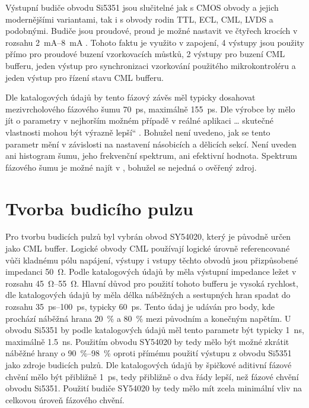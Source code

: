 Výstupní budiče obvodu Si5351 jsou slučitelné jak s \acrshort{CMOS} obvody a jejich modernějšími variantami, tak i s obvody rodin \acrshort{TTL}, \acrshort{ECL}, \acrshort{CML}, \acrshort{LVDS} a podobnými. Budiče jsou proudové, proud je možné nastavit ve čtyřech krocích v rozsahu \SIrange{2}{8}{\milli\ampere} \cite{Si5351datasheet}. Tohoto faktu je využito v zapojení, 4 výstupy jsou použity přímo pro proudové buzení vzorkovacích můstků, 2 výstupy pro buzení \acrshort{CML} bufferu, jeden výstup pro synchronizaci vzorkování použitého mikrokontroléru a jeden výstup pro řízení stavu \acrshort{CML} bufferu.

Dle katalogových údajů by tento fázový závěs měl typicky dosahovat mezivrcholového fázového šumu \SI{70}{\pico\second}, maximálně  \SI{155}{\pico\second}. Dle výrobce by mělo jít o parametry v \quotedblbase nejhorším možném případě v reálné aplikaci \ldots{} skutečné vlastnosti mohou být výrazně lepší\textquotedblleft{} \cite{Si5351datasheet}. Bohužel není uvedeno, jak se tento parametr mění v závislosti na nastavení násobicích a dělicích sekcí. Není uveden ani histogram šumu, jeho frekvenční spektrum, ani efektivní hodnota. Spektrum fázového šumu je možné najít v \cite{Si5351_phase_noise_measurement}, bohužel se nejedná o ověřený zdroj.

\section{Tvorba budicího pulzu}
Pro tvorbu budicích pulzů byl vybrán obvod SY54020, který je původně určen jako \acrshort{CML} buffer. Logické obvody \acrshort{CML} používají logické úrovně referencované vůči kladnému pólu napájení, výstupy i vstupy těchto obvodů jsou přizpůsobené impedanci \SI{50}{\ohm}. Podle katalogových údajů \cite{SY54020datasheet} by měla výstupní impedance ležet v rozsahu \SIrange{45}{55}{\ohm}. Hlavní důvod pro použití tohoto bufferu je vysoká rychlost, dle katalogových údajů by měla délka náběžných a sestupných hran spadat do rozsahu \SIrange{35}{100}{\pico\second}, typicky \SI{60}{ps}. Tento údaj je udáván pro body, kde prochází náběžná hrana \SI{20}{\%} a \SI{80}{\%} mezi původním a konečným napětím. U obvodu Si5351 by podle katalogových údajů měl tento parametr být typicky \SI{1}{\nano\second}, maximálně \SI{1.5}{\nano\second}. Použitím obvodu SY54020 by tedy mělo být možné zkrátit náběžné hrany o \SIrange{90}{98}{\%} oproti přímému použití výstupu z obvodu Si5351 jako zdroje budicích pulzů. Dle katalogových údajů by špičkové aditivní fázové chvění mělo být přibližně \SI{1}{\pico\second}, tedy přibližně o dva řády lepší, než fázové chvění obvodu Si5351. Použití budiče SY54020 by tedy mělo mít zcela minimální vliv na celkovou úroveň fázového chvění.

